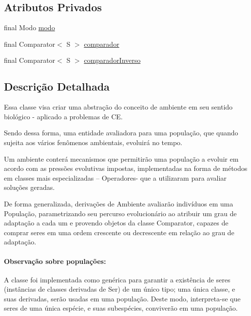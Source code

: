 \subsection*{Atributos Privados}
\begin{DoxyCompactItemize}
\item 
final Modo \hyperlink{classic_1_1populacional_1_1_ambiente_3_01_g_01extends_01_number_01_6_comparable_3_01_g_01_4_00_01a5eb548f12ccc7dbff4cf5c498ddc51_afdf6b3d04203015a78f9af1012306dff}{modo}
\item 
final Comparator$<$ S $>$ \hyperlink{classic_1_1populacional_1_1_ambiente_3_01_g_01extends_01_number_01_6_comparable_3_01_g_01_4_00_01a5eb548f12ccc7dbff4cf5c498ddc51_a76dbc9443f7efdba715adc9a0a712f87}{comparador}
\item 
final Comparator$<$ S $>$ \hyperlink{classic_1_1populacional_1_1_ambiente_3_01_g_01extends_01_number_01_6_comparable_3_01_g_01_4_00_01a5eb548f12ccc7dbff4cf5c498ddc51_ab66eaa46861ca2350fd604f36a1a6834}{comparador\-Inverso}
\end{DoxyCompactItemize}


\subsection{Descrição Detalhada}
Essa classe visa criar uma abstração do conceito de ambiente em seu sentido biológico -\/ aplicado a problemas de C\-E. 

Sendo dessa forma, uma entidade avaliadora para uma população, que quando sujeita aos vários fenômenos ambientais, evoluirá no tempo. 

Um ambiente conterá mecanismos que permitirão uma população a evoluir em acordo com as pressões evolutivas impostas, implementadas na forma de métodos em classes mais especializadas – Operadores-\/ que a utilizaram para avaliar soluções geradas. 

De forma generalizada, derivações de {\ttfamily Ambiente} avaliarão indivíduos em uma População, parametrizando seu percurso evolucionário ao atribuir um grau de adaptação a cada um e provendo objetos da classe {\ttfamily Comparator}, capazes de comprar seres em uma ordem crescente ou decrescente em relação ao grau de adaptação. 

\paragraph*{Observação sobre populações\-:}

A classe foi implementada como genérica para garantir a existência de seres (instâncias de classes derivadas de {\ttfamily Ser}) de um único tipo; uma única classe, e suas derivadas, serão usadas em uma população. Deste modo, interpreta-\/se que seres de uma única espécie, e suas subespécies, conviverão em uma população. 

